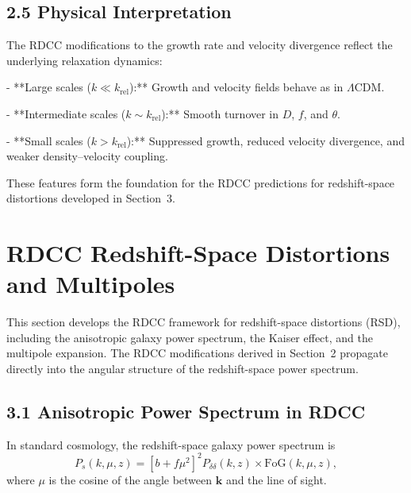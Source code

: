 \documentclass[11pt,a4paper]{article}
\begin{document}
\subsection{2.5 Physical Interpretation}

The RDCC modifications to the growth rate and velocity divergence reflect the underlying
relaxation dynamics:

- **Large scales ($k \ll k_{\mathrm{rel}}$):**  
  Growth and velocity fields behave as in $\Lambda$CDM.

- **Intermediate scales ($k \sim k_{\mathrm{rel}}$):**  
  Smooth turnover in $D$, $f$, and $\theta$.

- **Small scales ($k > k_{\mathrm{rel}}$):**  
  Suppressed growth, reduced velocity divergence, and weaker density–velocity coupling.

These features form the foundation for the RDCC predictions for redshift-space distortions
developed in Section~3.


\section{RDCC Redshift-Space Distortions and Multipoles}

This section develops the RDCC framework for redshift-space distortions (RSD), including the
anisotropic galaxy power spectrum, the Kaiser effect, and the multipole expansion. The RDCC
modifications derived in Section~2 propagate directly into the angular structure of the
redshift-space power spectrum.

\subsection{3.1 Anisotropic Power Spectrum in RDCC}

In standard cosmology, the redshift-space galaxy power spectrum is
\begin{equation}
P_{s}(k,\mu,z)
=
\left[
b + f\mu^{2}
\right]^{2}
P_{\delta\delta}(k,z)
\times
\mathrm{FoG}(k,\mu,z),
\end{equation}
where $\mu$ is the cosine of the angle between $\mathbf{k}$ and the line of sight.
\end{document}
